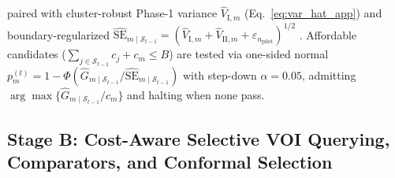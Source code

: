 \documentclass[11pt]{article}
\theoremstyle{remark}
\begin{document}
paired with cluster-robust Phase-1 variance $\widehat{V}_{\text{I},m}$ (Eq.~\eqref{eq:var_hat_app}) and boundary-regularized $\widehat{\text{SE}}_{m \mid \mathcal{S}_{t-1}} = (\widehat{V}_{\text{I},m} + \widehat{V}_{\text{II},m} + \varepsilon_{n_{\text{pilot}}})^{1/2}$ \citep{williamson2021nonparametric,williamson2023general}. Affordable candidates ($\sum_{j \in \mathcal{S}_{t-1}} c_j + c_m \le B$) are tested via one-sided normal $p_m^{(t)} = 1 - \Phi(\hat{G}_{m \mid \mathcal{S}_{t-1}} / \widehat{\text{SE}}_{m \mid \mathcal{S}_{t-1}})$ with \citet{holm1979simple} step-down $\alpha = 0.05$, admitting $\arg\max\{\hat{G}_{m \mid \mathcal{S}_{t-1}} / c_m\}$ and halting when none pass.

\subsection{Stage B: Cost-Aware Selective VOI Querying, Comparators, and Conformal Selection}
\label{sec:stage_b}
\end{document}
